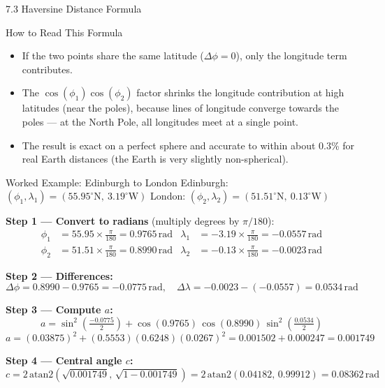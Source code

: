 \documentclass[aspectratio=169,10pt]{beamer}
\begin{document}
\begin{frame}[allowframebreaks]{7.3 Haversine Distance Formula}
\begin{alertblock}{How to Read This Formula}
    \begin{itemize}
      \item If the two points share the same latitude
            ($\Delta\phi = 0$), only the longitude term contributes.
      \item The $\cos(\phi_1)\cos(\phi_2)$ factor shrinks the
            longitude contribution at high latitudes (near the poles),
            because lines of longitude converge towards the poles ---
            at the North Pole, all longitudes meet at a single point.
      \item The result is exact on a perfect sphere and accurate to
            within about 0.3\% for real Earth distances (the Earth is
            very slightly non-spherical).
    \end{itemize}
  \end{alertblock}

  \framebreak

  \begin{exampleblock}{Worked Example: Edinburgh to London}
    Edinburgh: $(\phi_1, \lambda_1) = (55.95^{\circ}\text{N},\ 3.19^{\circ}\text{W})$
    \quad London: $(\phi_2, \lambda_2) = (51.51^{\circ}\text{N},\ 0.13^{\circ}\text{W})$

    \textbf{Step 1 — Convert to radians} (multiply degrees by $\pi/180$):
    \begin{align*}
      \phi_1 &= 55.95 \times \tfrac{\pi}{180} = 0.9765\,\text{rad}
      &\lambda_1 &= -3.19 \times \tfrac{\pi}{180} = -0.0557\,\text{rad} \\
      \phi_2 &= 51.51 \times \tfrac{\pi}{180} = 0.8990\,\text{rad}
      &\lambda_2 &= -0.13 \times \tfrac{\pi}{180} = -0.0023\,\text{rad}
    \end{align*}

    \textbf{Step 2 — Differences:}
    \[
      \Delta\phi = 0.8990 - 0.9765 = -0.0775\,\text{rad},
      \quad
      \Delta\lambda = -0.0023 - (-0.0557) = 0.0534\,\text{rad}
    \]

    \textbf{Step 3 — Compute $a$:}
    \[
      a = \sin^2\!\left(\tfrac{-0.0775}{2}\right)
          + \cos(0.9765)\,\cos(0.8990)\,\sin^2\!\left(\tfrac{0.0534}{2}\right)
    \]
    \[
      a = (0.03875)^2 + (0.5553)(0.6248)(0.0267)^2
        = 0.001502 + 0.000247 = 0.001749
    \]

    \textbf{Step 4 — Central angle $c$:}
    \[
      c = 2\,\mathrm{atan2}(\sqrt{0.001749},\,\sqrt{1 - 0.001749})
        = 2\,\mathrm{atan2}(0.04182,\,0.99912) = 0.08362\,\text{rad}
    \]


\end{exampleblock}
\end{frame}
\end{document}
